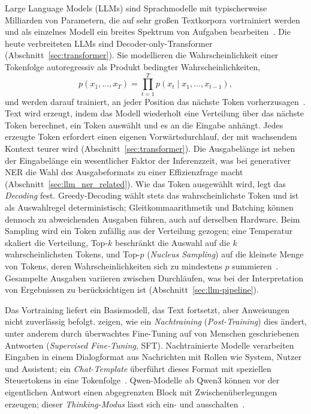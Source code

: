 Large Language Models (LLMs) sind Sprachmodelle mit typischerweise
Milliarden von Parametern, die auf sehr großen Textkorpora vortrainiert werden und als einzelnes
Modell ein breites Spektrum von Aufgaben bearbeiten~\cite{brown2020language,zhao2023survey}.
Die heute verbreiteten LLMs sind Decoder-only-Transformer
(Abschnitt~\ref{sec:transformer}).
Sie modellieren die Wahrscheinlichkeit einer Tokenfolge autoregressiv
als Produkt bedingter Wahrscheinlichkeiten,
\begin{equation}
  p(x_1, \dots, x_T) = \prod_{t=1}^{T} p(x_t \mid x_1, \dots, x_{t-1}),
  \label{eq:lm}
\end{equation}
und werden darauf trainiert, an jeder Position das nächste Token
vorherzusagen~\cite{brown2020language}.
Text wird erzeugt, indem das Modell wiederholt eine Verteilung über das
nächste Token berechnet, ein Token auswählt und es an die Eingabe
anhängt.
Jedes erzeugte Token erfordert einen eigenen Vorwärtsdurchlauf, der mit
wachsendem Kontext teurer wird (Abschnitt~\ref{sec:transformer}).
Die Ausgabelänge ist neben der Eingabelänge ein wesentlicher Faktor der
Inferenzzeit, was bei generativer NER die Wahl des Ausgabeformats zu
einer Effizienzfrage macht (Abschnitt~\ref{sec:llm_ner_related}).
Wie das Token ausgewählt wird, legt das \emph{Decoding} fest.
Greedy-Decoding wählt stets das wahrscheinlichste Token und ist als
Auswahlregel deterministisch; Gleitkommaarithmetik und Batching können
dennoch zu abweichenden Ausgaben führen, auch auf derselben Hardware.
Beim Sampling wird ein Token zufällig aus der Verteilung gezogen; eine
Temperatur skaliert die Verteilung, Top-$k$ beschränkt die Auswahl auf
die $k$ wahrscheinlichsten Tokens, und Top-$p$ (\emph{Nucleus Sampling})
auf die kleinste Menge von Tokens, deren Wahrscheinlichkeiten sich zu
mindestens $p$ summieren~\cite{holtzman2020curious}.
Gesampelte Ausgaben variieren zwischen Durchläufen, was bei der
Interpretation von Ergebnissen zu berücksichtigen ist
(Abschnitt~\ref{sec:llm-pipeline}).

Das Vortraining liefert ein Basismodell, das Text fortsetzt, aber
Anweisungen nicht zuverlässig befolgt.
\textcite{ouyang2022instructgpt} zeigen, wie ein \emph{Nachtraining}
(\emph{Post-Training}) dies ändert, unter anderem durch überwachtes
Fine-Tuning auf von Menschen geschriebenen Antworten
(\emph{Supervised Fine-Tuning}, SFT).
Nachtrainierte Modelle verarbeiten Eingaben in einem Dialogformat aus
Nachrichten mit Rollen wie System, Nutzer und Assistent; ein
\emph{Chat-Template} überführt dieses Format mit speziellen Steuertokens
in eine Tokenfolge~\cite{qwen2025qwen3,qwen2026card27b}.
Qwen-Modelle ab Qwen3 können vor der eigentlichen Antwort einen
abgegrenzten Block mit Zwischenüberlegungen erzeugen; dieser
\emph{Thinking-Modus} lässt sich ein- und
ausschalten~\cite{qwen2025qwen3}.

